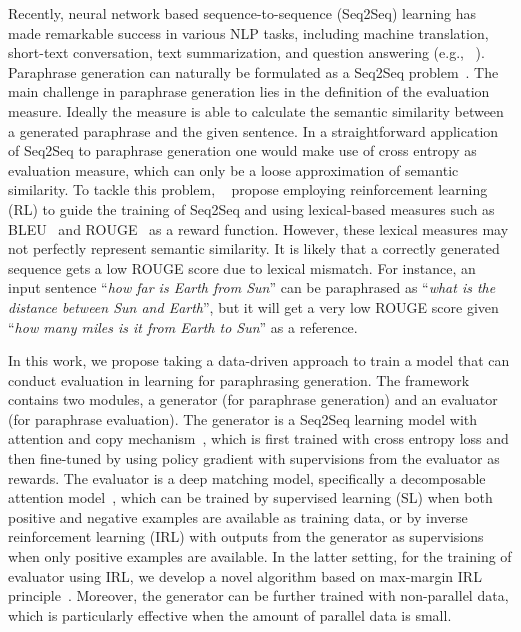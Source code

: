\documentclass[11pt,a4paper]{article}
\begin{document}
Recently, neural network based sequence-to-sequence (Seq2Seq) learning has made remarkable success in various NLP tasks, including machine translation, short-text conversation, text summarization, and question answering (e.g., ~\citet{cho2014learning,wu2016google,shang15neural,vinyals2015neural,rush2015neural,yin2015neural}). Paraphrase generation can naturally be formulated as a Seq2Seq problem~\citep{cao2017joint,prakash2016neural,gupta2017deep,su2017cross}.
The main challenge in paraphrase generation lies in the definition of the evaluation measure. Ideally the measure is able to calculate the semantic similarity between a generated paraphrase and the given sentence. In a straightforward application of Seq2Seq to paraphrase generation one would make use of cross entropy as evaluation measure, which can only be a loose approximation of semantic similarity. To tackle this problem, ~\citet{ranzato2015sequence} propose employing reinforcement learning (RL) to guide the training of Seq2Seq and using lexical-based measures such as BLEU~\citep{papineni2002bleu} and ROUGE~\citep{lin2004rouge} as a reward function. However, these lexical measures may not perfectly represent semantic similarity. It is likely that a correctly generated sequence gets a low ROUGE score due to lexical mismatch. For instance, an input sentence ``\textit{how far is Earth from Sun}'' can be paraphrased as ``\textit{what is the distance between Sun and Earth}'', but it will get a very low ROUGE score given ``\textit{how many miles is it from Earth to Sun}'' as a reference.

In this work, we propose taking a data-driven approach to train a model that can conduct evaluation in learning for paraphrasing generation. The framework contains two modules, a generator (for paraphrase generation) and an evaluator (for paraphrase evaluation). The generator is a Seq2Seq learning model with attention and copy mechanism~\citep{bahdanau2014neural,see2017get}, which is first trained with cross entropy loss and then fine-tuned by using policy gradient with supervisions from the evaluator as rewards. The evaluator is a deep matching model, specifically a decomposable attention model~\citep{parikh2016decomposable}, which can be trained by supervised learning (SL) when both positive and negative examples are available as training data, or by inverse reinforcement learning (IRL) with outputs from the generator as supervisions when only positive examples are available. In the latter setting, for the training of evaluator using IRL, we develop a novel algorithm based on max-margin IRL principle~\citep{ratliff2006maximum}. Moreover, the generator can be further trained with non-parallel data, which is particularly effective when the amount of parallel data is small.
\end{document}
